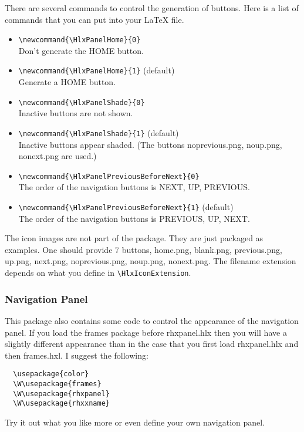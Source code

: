 There are several commands to control the generation of buttons.
Here is a list of commands that you can put into your LaTeX file.
\begin{itemize}
\item \verb'\newcommand{\HlxPanelHome}{0}'\\
  Don't generate the HOME button.
%  
\item \verb'\newcommand{\HlxPanelHome}{1}' (default)\\
  Generate a HOME button.
%  
\item \verb'\newcommand{\HlxPanelShade}{0}'\\
  Inactive buttons are not shown.
%  
\item \verb'\newcommand{\HlxPanelShade}{1}'  (default)\\
  Inactive buttons appear shaded. (The buttons noprevious.png,
  noup.png, nonext.png are used.)
%  
\item \verb'\newcommand{\HlxPanelPreviousBeforeNext}{0}'\\
  The order of the navigation buttons is NEXT, UP, PREVIOUS.
%  
\item \verb'\newcommand{\HlxPanelPreviousBeforeNext}{1}' (default)\\
  The order of the navigation buttons is PREVIOUS, UP, NEXT.
\end{itemize}

The icon images are not part of the package. They are just packaged as
examples. One should provide 7 buttons, home.png, blank.png,
previous.png, up.png, next.png, noprevious.png, noup.png, nonext.png.
The filename extension depends on what you define in
\verb'\HlxIconExtension'.









\subsubsection{Navigation Panel}
This package also contains some code to control the appearance of
the navigation panel. If you load the frames package before
rhxpanel.hlx then you will have a slightly different appearance
than in the case that you first load rhxpanel.hlx and then
frames.hxl. I suggest the following:
\begin{verbatim}
  \usepackage{color}
  \W\usepackage{frames}
  \W\usepackage{rhxpanel}
  \W\usepackage{rhxxname}
\end{verbatim}
Try it out what you like more or even define your own navigation
panel.












